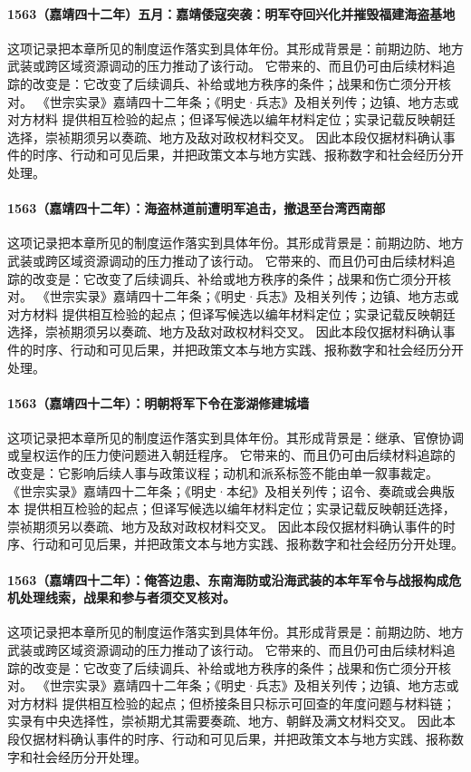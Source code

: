 \paragraph{1563（嘉靖四十二年）五月：嘉靖倭寇突袭：明军夺回兴化并摧毁福建海盗基地} 这项记录把本章所见的制度运作落实到具体年份。其形成背景是：前期边防、地方武装或跨区域资源调动的压力推动了该行动。 它带来的、而且仍可由后续材料追踪的改变是：它改变了后续调兵、补给或地方秩序的条件；战果和伤亡须分开核对。 《世宗实录》嘉靖四十二年条；《明史·兵志》及相关列传；边镇、地方志或对方材料 提供相互检验的起点；但译写候选以编年材料定位；实录记载反映朝廷选择，崇祯期须另以奏疏、地方及敌对政权材料交叉。 因此本段仅据材料确认事件的时序、行动和可见后果，并把政策文本与地方实践、报称数字和社会经历分开处理。

\paragraph{1563（嘉靖四十二年）：海盗林道前遭明军追击，撤退至台湾西南部} 这项记录把本章所见的制度运作落实到具体年份。其形成背景是：前期边防、地方武装或跨区域资源调动的压力推动了该行动。 它带来的、而且仍可由后续材料追踪的改变是：它改变了后续调兵、补给或地方秩序的条件；战果和伤亡须分开核对。 《世宗实录》嘉靖四十二年条；《明史·兵志》及相关列传；边镇、地方志或对方材料 提供相互检验的起点；但译写候选以编年材料定位；实录记载反映朝廷选择，崇祯期须另以奏疏、地方及敌对政权材料交叉。 因此本段仅据材料确认事件的时序、行动和可见后果，并把政策文本与地方实践、报称数字和社会经历分开处理。

\paragraph{1563（嘉靖四十二年）：明朝将军下令在澎湖修建城墙} 这项记录把本章所见的制度运作落实到具体年份。其形成背景是：继承、官僚协调或皇权运作的压力使问题进入朝廷程序。 它带来的、而且仍可由后续材料追踪的改变是：它影响后续人事与政策议程；动机和派系标签不能由单一叙事裁定。 《世宗实录》嘉靖四十二年条；《明史·本纪》及相关列传；诏令、奏疏或会典版本 提供相互检验的起点；但译写候选以编年材料定位；实录记载反映朝廷选择，崇祯期须另以奏疏、地方及敌对政权材料交叉。 因此本段仅据材料确认事件的时序、行动和可见后果，并把政策文本与地方实践、报称数字和社会经历分开处理。

\paragraph{1563（嘉靖四十二年）：俺答边患、东南海防或沿海武装的本年军令与战报构成危机处理线索，战果和参与者须交叉核对。} 这项记录把本章所见的制度运作落实到具体年份。其形成背景是：前期边防、地方武装或跨区域资源调动的压力推动了该行动。 它带来的、而且仍可由后续材料追踪的改变是：它改变了后续调兵、补给或地方秩序的条件；战果和伤亡须分开核对。 《世宗实录》嘉靖四十二年条；《明史·兵志》及相关列传；边镇、地方志或对方材料 提供相互检验的起点；但桥接条目只标示可回查的年度问题与材料链；实录有中央选择性，崇祯期尤其需要奏疏、地方、朝鲜及满文材料交叉。 因此本段仅据材料确认事件的时序、行动和可见后果，并把政策文本与地方实践、报称数字和社会经历分开处理。

